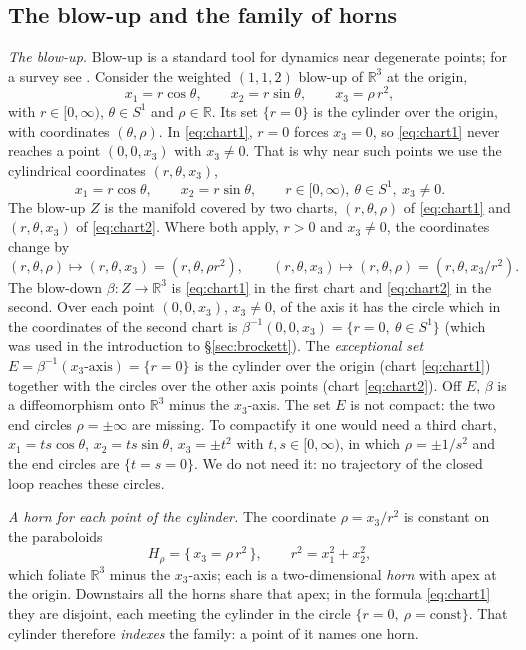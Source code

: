 \documentclass[11pt,reqno]{amsart}
\theoremstyle{plain}
\theoremstyle{definition}
\theoremstyle{remark}
\newcommand{\R}{\mathbb{R}}
\begin{document}
\subsection{The blow-up and the family of horns}\label{sec:horns}
\emph{The blow-up.} Blow-up is a standard tool for dynamics near degenerate points; for a survey see
\cite{JardonKuehn2021}. Consider the weighted $(1,1,2)$ blow-up of $\R^{3}$ at the origin,
\begin{equation}\label{eq:chart1}
  x_1=r\cos\theta,\qquad x_2=r\sin\theta,\qquad x_3=\rho\,r^{2},
\end{equation}
with $r\in[0,\infty)$, $\theta\in S^{1}$ and $\rho\in\R$. Its set $\{r=0\}$ is the
cylinder over the origin, with coordinates $(\theta,\rho)$. In \eqref{eq:chart1}, $r=0$ forces $x_3=0$, so \eqref{eq:chart1} never reaches a point
$(0,0,x_3)$ with $x_3\neq0$. That is why near such points we use the cylindrical coordinates
$(r,\theta,x_3)$,
\begin{equation}\label{eq:chart2}
  x_1=r\cos\theta,\qquad x_2=r\sin\theta,\qquad r\in[0,\infty),\ \theta\in S^{1},\ x_3\neq0 .
\end{equation}
The blow-up $Z$ is the manifold covered by two charts, $(r,\theta,\rho)$ of \eqref{eq:chart1} and
$(r,\theta,x_3)$ of \eqref{eq:chart2}. Where both apply, $r>0$ and $x_3\neq0$, the coordinates
change by
\[
  (r,\theta,\rho)\mapsto(r,\theta,x_3)=(r,\theta,\rho r^{2}),\qquad
  (r,\theta,x_3)\mapsto(r,\theta,\rho)=(r,\theta,x_3/r^{2}).
\]
The blow-down $\beta\colon Z\to\R^{3}$ is \eqref{eq:chart1} in the first chart and
\eqref{eq:chart2} in the second. Over each point $(0,0,x_3)$, $x_3\neq0$, of the axis it has the circle
which in the coordinates of the second chart is $\beta^{-1}(0,0,x_3)=\{r=0,\ \theta\in S^{1}\}$ (which was used in the introduction
to \S\ref{sec:brockett}).
The \emph{exceptional set} $E=\beta^{-1}(x_3\text{-axis})=\{r=0\}$ is the cylinder over the origin (chart
\eqref{eq:chart1}) together with the circles over the other axis points (chart \eqref{eq:chart2}).
Off $E$, $\beta$ is a diffeomorphism onto $\R^{3}$ minus the $x_3$-axis. The set $E$ is not
compact: the two end circles $\rho=\pm\infty$ are missing. To compactify it one would need a third chart,
$x_1=ts\cos\theta$, $x_2=ts\sin\theta$, $x_3=\pm t^{2}$ with $t,s\in[0,\infty)$, in which $\rho=\pm1/s^{2}$ and the end
circles are $\{t=s=0\}$. We do not need it: no trajectory of the closed loop reaches these circles.

\emph{A horn for each point of the cylinder.} The coordinate $\rho=x_3/r^{2}$ is constant
on the paraboloids
\[
  H_\rho=\{\,x_3=\rho\,r^{2}\,\},\qquad r^{2}=x_1^{2}+x_2^{2},
\]
which foliate $\R^{3}$ minus the $x_3$-axis; each is a two-dimensional \emph{horn} with
apex at the origin. Downstairs all the horns share that apex; in the formula
\eqref{eq:chart1} they are disjoint, each meeting the cylinder in the
circle $\{r=0,\ \rho=\mathrm{const}\}$. That cylinder therefore \emph{indexes} the family:
a point of it names one horn.
\end{document}
